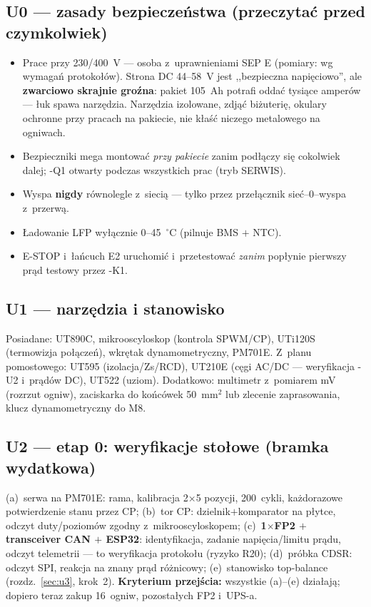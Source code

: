 \documentclass[11pt,a4paper]{article}
\newcommand{\krok}[1]{\textbf{\color{granat}Kryterium przejścia:} #1}
\begin{document}
\subsection{U0 --- zasady bezpieczeństwa (przeczytać przed czymkolwiek)}
\begin{itemize}
\item Prace przy 230/400~V --- osoba z~uprawnieniami SEP E (pomiary: wg wymagań protokołów). Strona DC
44--58~V jest ,,bezpieczna napięciowo'', ale \textbf{zwarciowo skrajnie groźna}: pakiet 105~Ah potrafi oddać
tysiące amperów --- łuk spawa narzędzia. Narzędzia izolowane, zdjąć biżuterię, okulary ochronne przy pracach
na pakiecie, nie kłaść niczego metalowego na ogniwach.
\item Bezpieczniki mega montować \emph{przy pakiecie} zanim podłączy się cokolwiek dalej; -Q1 otwarty
podczas wszystkich prac (tryb SERWIS).
\item Wyspa \textbf{nigdy} równolegle z~siecią --- tylko przez przełącznik sieć--0--wyspa z~przerwą.
\item Ładowanie LFP wyłącznie 0--45~$^{\circ}$C (pilnuje BMS $+$ NTC).
\item E-STOP i~łańcuch E2 uruchomić i~przetestować \emph{zanim} popłynie pierwszy prąd testowy przez -K1.
\end{itemize}

\subsection{U1 --- narzędzia i stanowisko}
Posiadane: UT890C, mikrooscyloskop (kontrola SPWM/CP), UTi120S (termowizja połączeń), wkrętak
dynamometryczny, PM701E. Z~planu pomostowego: UT595 (izolacja/Zs/RCD), UT210E (cęgi AC/DC ---
weryfikacja -U2 i~prądów DC), UT522 (uziom). Dodatkowo: multimetr z~pomiarem mV (rozrzut ogniw),
zaciskarka do końcówek 50~mm$^2$ lub zlecenie zaprasowania, klucz dynamometryczny do M8.

\subsection{U2 --- etap 0: weryfikacje stołowe (bramka wydatkowa)}
(a)~serwa na PM701E: rama, kalibracja 2$\times$5 pozycji, 200~cykli, każdorazowe potwierdzenie stanu przez
CP; (b)~tor CP: dzielnik$+$komparator na płytce, odczyt duty/poziomów zgodny z~mikrooscyloskopem;
(c)~\textbf{1$\times$FP2 $+$ transceiver CAN $+$ ESP32}: identyfikacja, zadanie napięcia/limitu prądu, odczyt
telemetrii --- to weryfikacja protokołu (ryzyko R20); (d)~próbka CDSR: odczyt SPI, reakcja na znany prąd
różnicowy; (e)~stanowisko top-balance (rozdz.~\ref{sec:u3}, krok~2). \krok{wszystkie (a)--(e) działają;
dopiero teraz zakup 16~ogniw, pozostałych FP2 i~UPS-a.}
\end{document}
